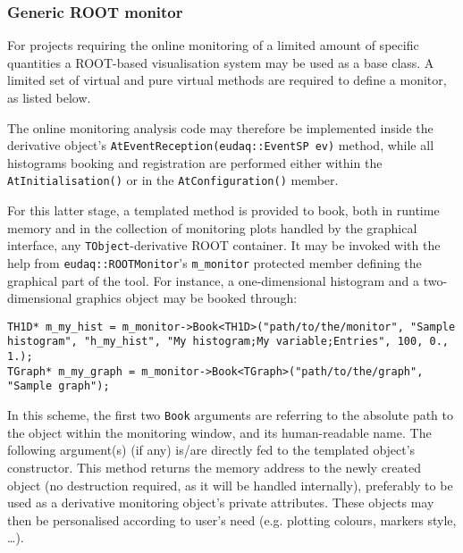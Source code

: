\subsubsection{Generic ROOT monitor}
For projects requiring the online monitoring of a limited amount of specific quantities a ROOT-based visualisation system may be used as a base class.
A limited set of virtual and pure virtual methods are required to define a monitor, as listed below.



The online monitoring analysis code may therefore be implemented inside the derivative object's \lstinline[style=cpp]{AtEventReception(eudaq::EventSP ev)} method, while all histograms booking and registration are performed either within the \lstinline[style=cpp]{AtInitialisation()} or in the \lstinline[style=cpp]{AtConfiguration()} member.

For this latter stage, a templated method is provided to book, both in runtime memory and in the collection of monitoring plots handled by the graphical interface, any \lstinline[style=cpp]{TObject}-derivative ROOT container.
It may be invoked with the help from \lstinline[style=cpp]{eudaq::ROOTMonitor}'s \lstinline[style=cpp]{m_monitor} protected member defining the graphical part of the tool.
For instance, a one-dimensional histogram and a two-dimensional graphics object may be booked through:

\begin{lstlisting}[style=cpp]
TH1D* m_my_hist = m_monitor->Book<TH1D>("path/to/the/monitor", "Sample histogram", "h_my_hist", "My histogram;My variable;Entries", 100, 0., 1.);
TGraph* m_my_graph = m_monitor->Book<TGraph>("path/to/the/graph", "Sample graph");
\end{lstlisting}

In this scheme, the first two \lstinline[style=cpp]{Book} arguments are referring to the absolute path to the object within the monitoring window, and its human-readable name. The following argument(s) (if any) is/are directly fed to the templated object's constructor.
This method returns the memory address to the newly created object (no destruction required, as it will be handled internally), preferably to be used as a derivative monitoring object's private attributes.
These objects may then be personalised according to user's need (e.g. plotting colours, markers style, \ldots).

